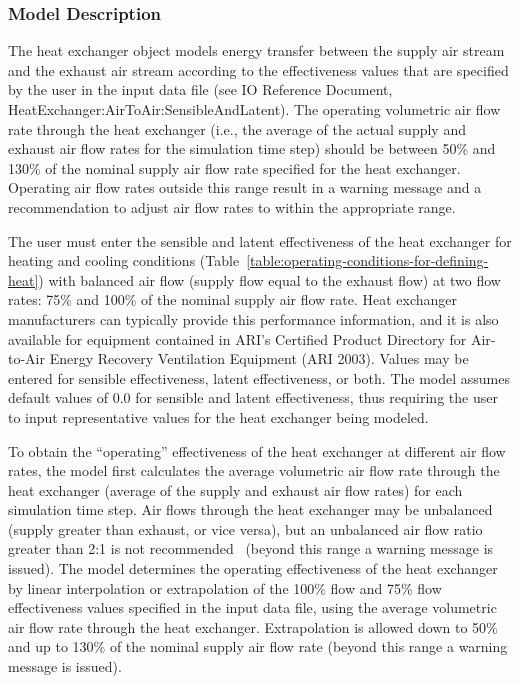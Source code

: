 \subsubsection{Model Description}\label{model-description-011}

The heat exchanger object models energy transfer between the supply air stream and the exhaust air stream according to the effectiveness values that are specified by the user in the input data file (see IO Reference Document, HeatExchanger:AirToAir:SensibleAndLatent). The operating volumetric air flow rate through the heat exchanger (i.e., the average of the actual supply and exhaust air flow rates for the simulation time step) should be between 50\% and 130\% of the nominal supply air flow rate specified for the heat exchanger. Operating air flow rates outside this range result in a warning message and a recommendation to adjust air flow rates to within the appropriate range.

The user must enter the sensible and latent effectiveness of the heat exchanger for heating and cooling conditions (Table~\ref{table:operating-conditions-for-defining-heat}) with balanced air flow (supply flow equal to the exhaust flow) at two flow rates: 75\% and 100\% of the nominal supply air flow rate. Heat exchanger manufacturers can typically provide this performance information, and it is also available for equipment contained in ARI's Certified Product Directory for Air-to-Air Energy Recovery Ventilation Equipment (ARI 2003). Values may be entered for sensible effectiveness, latent effectiveness, or both. The model assumes default values of 0.0 for sensible and latent effectiveness, thus requiring the user to input representative values for the heat exchanger being modeled.

To obtain the ``operating'' effectiveness of the heat exchanger at different air flow rates, the model first calculates the average volumetric air flow rate through the heat exchanger (average of the supply and exhaust air flow rates) for each simulation time step. Air flows through the heat exchanger may be unbalanced (supply greater than exhaust, or vice versa), but an unbalanced air flow ratio greater than 2:1 is not recommended~ (beyond this range a warning message is issued). The model determines the operating effectiveness of the heat exchanger by linear interpolation or extrapolation of the 100\% flow and 75\% flow effectiveness values specified in the input data file, using the average volumetric air flow rate through the heat exchanger. Extrapolation is allowed down to 50\% and up to 130\% of the nominal supply air flow rate (beyond this range a warning message is issued).

